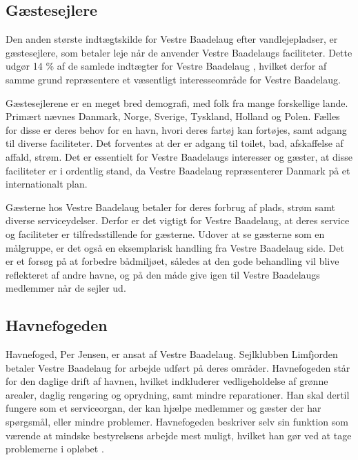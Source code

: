 

\subsection{Gæstesejlere}

Den anden største indtægtskilde for Vestre Baadelaug efter vandlejepladser, er gæstesejlere, som betaler leje når de anvender Vestre Baadelaugs faciliteter. Dette udgør 14 \% af de samlede indtægter for Vestre Baadelaug \cite{vestre_arsregnskab}, hvilket derfor af samme grund repræsentere et væsentligt interesseområde for Vestre Baadelaug.

Gæstesejlerene er en meget bred demografi, med folk fra mange forskellige lande. Primært nævnes Danmark, Norge, Sverige, Tyskland, Holland og Polen. Fælles for disse er deres behov for en havn, hvori deres fartøj kan fortøjes, samt adgang til diverse faciliteter. Det forventes at der er adgang til toilet, bad, afskaffelse af affald, strøm. Det er essentielt for Vestre Baadelaugs interesser og gæster, at disse faciliteter er i ordentlig stand, da Vestre Baadelaug repræsenterer Danmark på et internationalt plan.

Gæsterne hos Vestre Baadelaug betaler for deres forbrug af plads, strøm samt diverse serviceydelser. Derfor er det vigtigt for Vestre Baadelaug, at deres service og faciliteter er tilfredsstillende for gæsterne. Udover at se gæsterne som en målgruppe, er det også en eksemplarisk handling fra Vestre Baadelaug side. Det er et forsøg på at forbedre bådmiljøet, således at den gode behandling vil blive reflekteret af andre havne, og på den måde give igen til Vestre Baadelaugs medlemmer når de sejler ud.


\subsection{Havnefogeden} \label{sub:havnefoged}

Havnefoged, Per Jensen, er ansat af Vestre Baadelaug. Sejlklubben Limfjorden betaler Vestre Baadelaug for arbejde udført på deres områder. Havnefogeden står for den daglige drift af havnen, hvilket indkluderer vedligeholdelse af grønne arealer, daglig rengøring og oprydning, samt mindre reparationer. Han skal dertil fungere som et serviceorgan, der kan hjælpe medlemmer og gæster der har spørgsmål, eller mindre problemer. Havnefogeden beskriver selv sin funktion som værende at mindske bestyrelsens arbejde mest muligt, hvilket han gør ved at tage problemerne i opløbet \cite{int_hf}.

